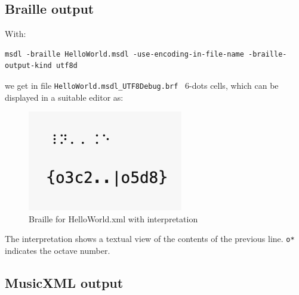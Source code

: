 \subsection{Braille output}

With:
\begin{lstlisting}[language=Terminal]
msdl -braille HelloWorld.msdl -use-encoding-in-file-name -braille-output-kind utf8d
\end{lstlisting}

we get in file {\tt HelloWorld.msdl_UTF8Debug.brf} \braille\ 6-dots cells, which can be displayed in a suitable editor as:
\begin{figure}[htbp]
\begin{center}
\includegraphics{../graphics/BrailleForHelloWorld.xmlWithInterpretation.png}

\caption{Braille for HelloWorld.xml with interpretation}
\label{Braille for HelloWorld.xml with interpretation}
\end{center}
\end{figure}

The interpretation shows a textual view of the contents of the previous line. {\tt o*} indicates the octave number.

\subsection{MusicXML output}

